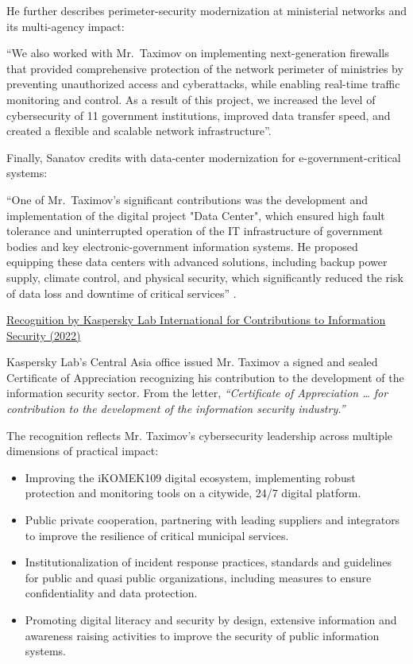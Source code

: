 He further describes perimeter-security modernization at ministerial networks and its multi-agency impact:
\begin{fullquote}
``We also worked with Mr.\ Taximov on implementing next-generation firewalls that provided comprehensive protection of the network perimeter of ministries by preventing unauthorized access and cyberattacks, while enabling real-time traffic monitoring and control. As a result of this project, we increased the level of cybersecurity of 11 government institutions, improved data transfer speed, and created a flexible and scalable network infrastructure''.
\end{fullquote}

Finally, Sanatov credits \mrl{} with data-center modernization for e-government-critical systems:
\begin{fullquote}
``One of Mr.\ Taximov’s significant contributions was the development and implementation of the digital project "Data Center", which ensured high fault tolerance and uninterrupted operation of the IT infrastructure of government bodies and key electronic-government information systems. He proposed equipping these data centers with advanced solutions, including backup power supply, climate control, and physical security, which significantly reduced the risk of data loss and downtime of critical services''  .
\end{fullquote}

\bigskip
\noindent\underline{Recognition by Kaspersky Lab International for Contributions to Information Security (2022)}


Kaspersky Lab's Central Asia office issued Mr. Taximov a signed and sealed Certificate of Appreciation recognizing his contribution to the development of the information security sector. From the letter, \emph{``Certificate of Appreciation … for contribution to the development of the information security industry.''} 


The recognition reflects Mr. Taximov's cybersecurity leadership across multiple dimensions of practical impact:


\vspace{-0.5\baselineskip}
\begin{itemize}[nosep]
\item Improving the iKOMEK109 digital ecosystem, implementing robust protection and monitoring tools on a citywide, 24/7 digital platform.
\item Public private cooperation, partnering with leading suppliers and integrators to improve the resilience of critical municipal services.
\item Institutionalization of incident response practices, standards and guidelines for public and quasi public organizations, including measures to ensure confidentiality and data protection.
\item Promoting digital literacy and security by design, extensive information and awareness raising activities to improve the security of public information systems.
\end{itemize}



